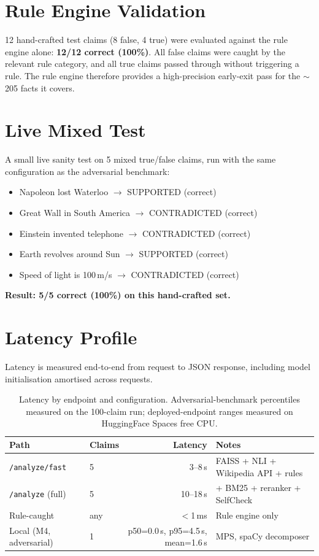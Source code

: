 \documentclass[12pt, a4paper, oneside]{report}
\begin{document}
\section{Rule Engine Validation}

12 hand-crafted test claims (8 false, 4 true) were evaluated against the rule engine alone: \textbf{12/12 correct (100\%)}. All false claims were caught by the relevant rule category, and all true claims passed through without triggering a rule. The rule engine therefore provides a high-precision early-exit pass for the $\sim$205 facts it covers.

\section{Live Mixed Test}

A small live sanity test on 5 mixed true/false claims, run with the same configuration as the adversarial benchmark:
\begin{itemize}[nosep]
    \item Napoleon lost Waterloo $\rightarrow$ SUPPORTED (correct)
    \item Great Wall in South America $\rightarrow$ CONTRADICTED (correct)
    \item Einstein invented telephone $\rightarrow$ CONTRADICTED (correct)
    \item Earth revolves around Sun $\rightarrow$ SUPPORTED (correct)
    \item Speed of light is 100\,m/s $\rightarrow$ CONTRADICTED (correct)
\end{itemize}
\textbf{Result: 5/5 correct (100\%) on this hand-crafted set.}

\section{Latency Profile}

Latency is measured end-to-end from request to JSON response, including model initialisation amortised across requests.

\begin{table}[H]
\centering
\caption{Latency by endpoint and configuration. Adversarial-benchmark percentiles measured on the 100-claim run; deployed-endpoint ranges measured on HuggingFace Spaces free CPU.}
\label{tab:latency}
\begin{tabular}{l l r l}
\toprule
\textbf{Path} & \textbf{Claims} & \textbf{Latency} & \textbf{Notes} \\
\midrule
\texttt{/analyze/fast} & 5 & 3--8\,s & FAISS + NLI + Wikipedia API + rules \\
\texttt{/analyze} (full) & 5 & 10--18\,s & + BM25 + reranker + SelfCheck \\
Rule-caught & any & $<$1\,ms & Rule engine only \\
Local (M4, adversarial) & 1 & p50=0.0\,s, p95=4.5\,s, mean=1.6\,s & MPS, spaCy decomposer \\
\bottomrule
\end{tabular}
\end{table}
\end{document}
